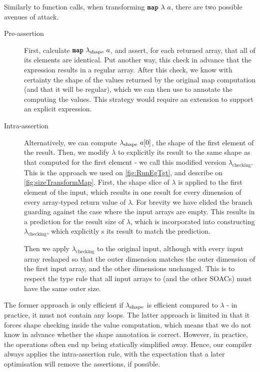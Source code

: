 Similarly to function calls, when transforming $\mbox{\texttt{\bfseries{map}}}~\lambda~a$,
there are two possible avenues of attack.

\begin{description}
\item[Pre-assertion] First, calculate $\mbox{\texttt{\bfseries{map}}}~\lambda_{\textrm{shape}}~a$,
  and assert, for each returned array, that all of its elements are
  identical.  Put another way, this check in advance that the 
  expression results in a regular array.  After this check, we know
  with certainty the shape of the values returned by the original map
  computation (and that it will be regular), which we can then use to
  annotate the  computing the values.  This strategy would
  require an extension to support an explicit  expression.

\item[Intra-assertion] Alternatively, we can compute
  \(\lambda_{\textrm{shape}}~a[0]\), the shape of the first element of the
  result.  Then, we modify $\lambda$ to explicitly  its
  result to the same shape as that computed for the first element - we
  call this modified version \(\lambda_{\textrm{checking}}\).  This is
  the approach we used on \cref{fig:RunEgTgt}, and describe on
  \cref{fig:sizeTransformMap}.  First, the shape slice of $\lambda$ is
  applied to the first element of the input, which results in one
  result for every dimension of every array-typed return value of
  $\lambda$.  For brevity we have elided the branch guarding against
  the case where the input arrays are empty.  This results in a
  prediction for the result size of $\lambda$, which is incorporated
  into constructing $\lambda_{\text{checking}}$, which explicitly
  s its result to match the prediction.

  Then we apply $\lambda_{\text{checking}}$ to the original input,
  although with every input array reshaped so that the outer
  dimension matches the outer dimension of the first input array, and
  the other dimensions unchanged.  This is to respect the type rule
  that all input arrays to  (and the other SOACs) must have
  the same outer size.
\end{description}

The former approach is only efficient if \(\lambda_{\text{\textrm{shape}}}\)
is efficient compared to \(\lambda\) - in practice, it must not
contain any loops.  The latter approach is limited in that it forces
shape checking inside the value computation, which means that we do
not know in advance whether the shape annotation is correct.  However,
in practice, the  operations often end up being statically
simplified away.  Hence, our compiler always applies the
intra-assertion rule, with the expectation that a later optimisation
will remove the assertions, if possible.

